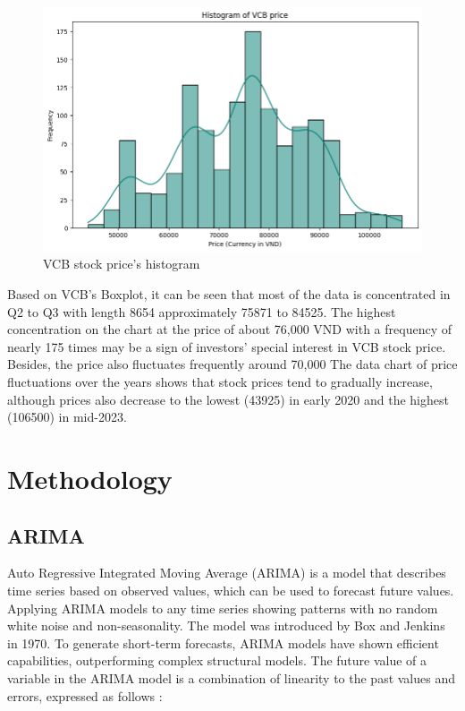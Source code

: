 \documentclass{ieeeojies}
\begin{document}
\begin{figure}[H]
\begin{minipage}{0.23\textwidth}
        \includegraphics[width=\textwidth]{bibliography/Figure/VCBhist.png}
        \caption{VCB stock price's histogram}
        \label{fig:3}
    \end{minipage}
\end{figure}

 Based on VCB's Boxplot, it can be seen that most of the data is concentrated in Q2 to Q3 with length 8654 approximately 75871 to 84525.
The highest concentration on the chart at the price of about 76,000 VND with a frequency of nearly 175 times may be a sign of investors' special interest in VCB stock price. Besides, the price also fluctuates frequently around 70,000
The data chart of price fluctuations over the years shows that stock prices tend to gradually increase, although prices also decrease to the lowest (43925) in early 2020 and the highest (106500) in mid-2023.
\section{Methodology}

\subsection{ARIMA}
Auto Regressive Integrated Moving Average (ARIMA) is a model that describes time series based on observed values, which can be used to forecast future values. Applying ARIMA models to any time series showing patterns with no random white noise and non-seasonality. The model was introduced by Box and Jenkins in 1970. To generate short-term forecasts, ARIMA models have shown efficient capabilities, outperforming complex structural models. The future value of a variable in the ARIMA model is a combination of linearity to the past values and errors, expressed as follows \cite{Gillian}:
\end{document}
